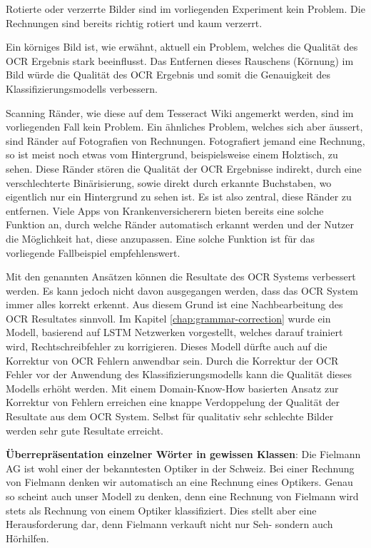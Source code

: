 Rotierte oder verzerrte Bilder sind im vorliegenden Experiment kein Problem. Die Rechnungen sind bereits richtig rotiert und kaum verzerrt.

Ein körniges Bild ist, wie erwähnt, aktuell ein Problem, welches die Qualität des OCR Ergebnis stark beeinflusst. Das Entfernen dieses Rauschens (Körnung) im Bild würde die Qualität des OCR Ergebnis und somit die Genauigkeit des Klassifizierungsmodells verbessern.

Scanning Ränder, wie diese auf dem Tesseract Wiki angemerkt werden, sind im vorliegenden Fall kein Problem. Ein ähnliches Problem, welches sich aber äussert, sind Ränder auf Fotografien von Rechnungen. Fotografiert jemand eine Rechnung, so ist meist noch etwas vom Hintergrund, beispielsweise einem Holztisch, zu sehen. Diese Ränder stören die Qualität der OCR Ergebnisse indirekt, durch eine verschlechterte Binärisierung, sowie direkt durch erkannte Buchstaben, wo eigentlich nur ein Hintergrund zu sehen ist. Es ist also zentral, diese Ränder zu entfernen. Viele Apps von Krankenversicherern bieten bereits eine solche Funktion an, durch welche Ränder automatisch erkannt werden und der Nutzer die Möglichkeit hat, diese anzupassen. Eine solche Funktion ist für das vorliegende Fallbeispiel empfehlenswert.

Mit den genannten Ansätzen können die Resultate des OCR Systems verbessert werden. Es kann jedoch nicht davon ausgegangen werden, dass das OCR System immer alles korrekt erkennt. Aus diesem Grund ist eine Nachbearbeitung des OCR Resultates sinnvoll. Im Kapitel \ref{chap:grammar-correction} wurde ein Modell, basierend auf LSTM Netzwerken vorgestellt, welches darauf trainiert wird, Rechtschreibfehler zu korrigieren. Dieses Modell dürfte auch auf die Korrektur von OCR Fehlern anwendbar sein. Durch die Korrektur der OCR Fehler vor der Anwendung des Klassifizierungsmodells kann die Qualität dieses Modells erhöht werden. Mit einem Domain-Know-How basierten Ansatz zur Korrektur von Fehlern erreichen \textcite{OCRCorrection} eine knappe Verdoppelung der Qualität der Resultate aus dem OCR System. Selbst für qualitativ sehr schlechte Bilder werden sehr gute Resultate erreicht.


\textbf{Überrepräsentation einzelner Wörter in gewissen Klassen}: Die Fielmann AG ist wohl einer der bekanntesten Optiker in der Schweiz. Bei einer Rechnung von Fielmann denken wir automatisch an eine Rechnung eines Optikers. Genau so scheint auch unser Modell zu denken, denn eine Rechnung von Fielmann wird stets als Rechnung von einem Optiker klassifiziert. Dies stellt aber eine Herausforderung dar, denn Fielmann verkauft nicht nur Seh- sondern auch Hörhilfen.

